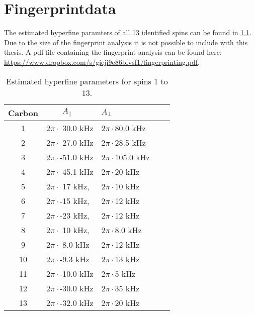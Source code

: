 \chapter{Fingerprintdata}
\label{chap:Fingerprint_data_appendix}
The estimated hyperfine paramters of all 13 identified spins can be found in \cref{tbl:HF_par_appendix}. Due to the size of the fingerprint analysis it is not possible to include with this thesis. A pdf file containing the fingerprint analysis can be found here: \url{https://www.dropbox.com/s/gieji9e86bfvsf1/fingerprinting.pdf}.

\begin{table}[htbp]
    \begin{tabular}{cllll}

    Carbon &  $\quad \quad A_{\parallel} $ &\quad \quad  $A_{\perp}$ \\ \hline
    1 & 2$\pi \cdot $     30.0 kHz & 2$\pi \cdot $80.0 kHz \\
    2 & 2$\pi \cdot $     27.0 kHz & 2$\pi \cdot $28.5 kHz \\
    3 & 2$\pi \cdot $-51.0 kHz & 2$\pi \cdot $105.0 kHz \\
    4 & 2$\pi \cdot $     45.1 kHz & 2$\pi \cdot $20 kHz \\
    5 & 2$\pi \cdot $     17 kHz, & 2$\pi \cdot $10 kHz \\
    6 & 2$\pi \cdot $-15 kHz, & 2$\pi \cdot $12 kHz \\
    7 & 2$\pi \cdot $-23 kHz, & 2$\pi \cdot $12 kHz \\
    8 & 2$\pi \cdot $     10 kHz, & 2$\pi \cdot $8.0 kHz \\
    9 & 2$\pi \cdot $     8.0 kHz & 2$\pi \cdot $12 kHz \\
    10 & 2$\pi \cdot $-9.3 kHz & 2$\pi \cdot $13 kHz \\
    11 & 2$\pi \cdot $-10.0 kHz & 2$\pi \cdot $5 kHz \\
    12 & 2$\pi \cdot $-30.0 kHz & 2$\pi \cdot $35 kHz \\
    13 & 2$\pi \cdot $-32.0 kHz & 2$\pi \cdot $20 kHz \\
    \end{tabular}
    \caption{Estimated hyperfine parameters for spins 1 to 13.}
    \label{tbl:HF_par_appendix}
\end{table}
